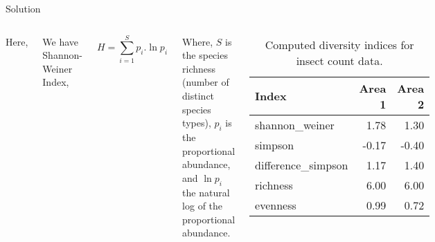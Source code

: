 \documentclass[
  ignorenonframetext,
  aspectratio=169]{beamer}
\begin{document}
\begin{frame}{Solution}
\protect\hypertarget{solution}{}
\begin{columns}[T,onlytextwidth]

Here, 

We have Shannon-Weiner Index,

$$ 
H = \sum_{i = 1}^S{p_i.\ln p_i}
$$

Where, $S$ is the species richness (number of distinct species types), $p_i$ is the proportional abundance, and $\ln p_i$ the natural log of the proportional abundance.


\begin{table}

\caption{\label{tab:insect-area-index-calculation}Computed diversity indices for insect count data.}
\centering
\fontsize{8}{10}\selectfont
\begin{tabular}[t]{lrr}
\toprule
Index & Area 1 & Area 2\\
\midrule
shannon\_weiner & 1.78 & 1.30\\
simpson & -0.17 & -0.40\\
difference\_simpson & 1.17 & 1.40\\
richness & 6.00 & 6.00\\
evenness & 0.99 & 0.72\\
\bottomrule
\end{tabular}
\end{table}

\end{columns}
\end{frame}
\end{document}
